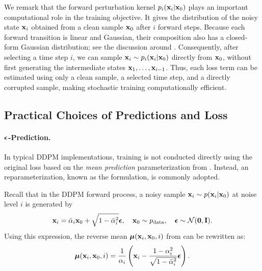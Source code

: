 We remark that the forward perturbation kernel $p_i({\mathbf{x}}_i | {\mathbf{x}}_0)
$
plays an important computational role in the training objective. It gives the
distribution of the noisy state ${\mathbf{x}}_i$ obtained from a clean sample ${\mathbf{x}}_0$
after $i$ forward steps. Because each forward transition is linear and
Gaussian, their composition also has a closed-form Gaussian distribution; see
the discussion around . Consequently, after selecting a
time step $i$, we can sample ${\mathbf{x}}_i \sim p_i({\mathbf{x}}_i | {\mathbf{x}}_0)
$
directly from ${\mathbf{x}}_0$, without first generating the intermediate states
${\mathbf{x}}_1,\ldots,{\mathbf{x}}_{i-1}$.  Thus, each
loss term can be estimated using only a clean sample, a selected time step, and
a directly corrupted sample, making stochastic training computationally
efficient.


\subsection{Practical Choices of Predictions and Loss}\label{subsec:ddpm-prediction}

\paragraph{${\bm{\epsilon}}$-Prediction.}
In typical DDPM implementations, training is not conducted directly using the original loss based on the \emph{mean prediction} parameterization from . Instead, an  reparameterization, known as the  formulation, is commonly adopted.  

Recall that in the DDPM forward process, a noisy sample ${\mathbf{x}}_i \sim p({\mathbf{x}}_i |{\mathbf{x}}_0)$ at noise level $i$ is generated by
\begin{equation}\label{eq:ddpm-perturbation}
    {\mathbf{x}}_i = \bar{\alpha}_i {\mathbf{x}}_0 + \sqrt{1 - \bar{\alpha}_i^2}   \boldsymbol{\epsilon}, \quad {\mathbf{x}}_0 \sim p_{\text{data}}, \quad \boldsymbol{\epsilon} \sim \mathcal{N}(\mathbf{0}, \mathbf{I}).
\end{equation}
Using this expression, the reverse mean $\bm{\mu}({\mathbf{x}}_i, {\mathbf{x}}_0, i)$ from  can be rewritten as:
\[
\bm{\mu}({\mathbf{x}}_i, {\mathbf{x}}_0, i) = \frac{1}{\alpha_i} \left( {\mathbf{x}}_i - \frac{1 - \alpha_i^2}{\sqrt{1 - \bar{\alpha}_i^2}} \boldsymbol{\epsilon} \right).
\]

